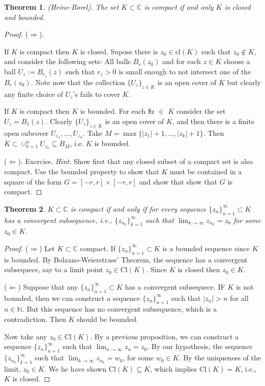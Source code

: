 \documentclass{amsart}
\newtheorem{thm}{Theorem}
\begin{document}
\begin{thm}
(\alert{Heine-Borel}). The set \(K\subset \mathbb{C}\) is compact if and only \(K\) is closed and bounded.
\end{thm}
\begin{proof}


(\(\Rightarrow\)).

If \(K\) is compact then \(K\) is closed. Supose there is \(z_0\in \mbox{cl}(K)\) such that \(z_0\notin K\), and consider the following sets: All balls \(B_r(z_0)\) and for each \(z\in K\) choose a ball \(U_z:=B_{r_z}(z)\) such that \(r_z>0\) is small enough to not intersect one of the \(B_r(z_0)\). Note now that the collection \(\{U_z \}_{z\in K}\) is an open cover of \(K\) but clearly any finite choice of \(U_z\)'s fails to cover \(K\).

If \(K\) is compact then \(K\) is bounded. For each \$z \(\in\) \(K\) consider the set \(U_{z} = B_{1}(z)\). Clearly \(\{U_z \}_{z\in K}\) is an open cover of \(K\), and then there is a finite open subcover \(U_{z_1}, \ldots, U_{z_n}\). Take \(M = \max\{|z_1| + 1, \ldots, |z_k| +1 \}\). Then \(K \subset \cup_{k=1}^{n} U_{z_k} \subseteq B_M\), i.e. \(K\) is bounded.

(\(\Leftarrow\)). Exercise.
\emph{Hint}. Show first that any closed subset of a compact set is also compact. Use the bounded property to show that \(K\) must be contained in a square of the form \(G= [-r,r]\times [-r,r]\) and show that show that \(G\) is compact.
\end{proof}

\begin{thm}
\(K\subset \mathbb{C}\) is compact if and only if for every sequence \(\{z_n\}_{n=1}^{\infty}\subset K\) has a convergent subsequence, i.e., \(\{z_{n_k}\}_{k=1}^{\infty}\) such that \(\lim_{k\to\infty} z_{n_k} = z_0\) for some \(z_0\in K\).
\end{thm}
\begin{proof}
(\(\Rightarrow\)) Let \(K\subset\mathbb{C}\) compact. If \(\{z_n\}_{n=1}^{\infty}\subset K\) is a bounded sequence since \(K\) is bounded. By Bolzano-Weierstrass' Theorem, the sequence has a convergent subsequece, say to a limit point \(z_0\in \mbox{Cl}(K)\). Since \(K\) is closed then \(z_0\in K\).


(\(\Leftarrow\)) Suppose that any  \(\{z_n\}_{n=1}^{\infty}\subset K\)  has a convergent subsequece. IF \(K\) is not bounded, then we can construct a sequence \(\{z_n\}_{n=1}^{\infty}\) such that \(|z_n| > n\) for all \(n\in \mathbb{N}\). But this sequence has no convergent subsequence, which is a contradiction. Then \(K\) should be bounded.

Now take any \(z_0\in \mbox{Cl}(K)\). By a previous proposition, we can construct a sequence  \(\{z_{n}\}_{n=1}^{\infty}\) such that \(\lim_{n\to\infty} z_n = z_0\). By our hypothesis, the sequence \(\{z_{n_k}\}_{k=1}^{\infty}\) such that \(\lim_{k\to\infty} z_{n_k} = w_0\), for some \(w_0\in K\). By the uniqueness of the limit, \(z_0 \in K\). We he have shown \(\mbox{Cl}(K) \subseteq K\), which implies \(\mbox{Cl}(K) = K\), i.e., \(K\) is closed.
\end{proof}
\end{document}

